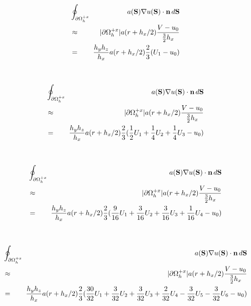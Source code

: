 \documentclass[10pt]{article}
\begin{document}
\begin{minipage}{1.75in}
\end{minipage} \ \ \ \ 
\begin{minipage}{4.00in}
\begin{eqnarray*}
& \oint_{\partial\Omega_h^{+x}} \!\!\! & a(\textbf{S}) \nabla u(\textbf{S})\cdot \textbf{n} \, d\textbf{S}  \\
& \approx & |\partial\Omega_h^{+x}| a(r+h_x/2) \frac{V - u_0}{\frac{3}{2}h_x} \\
& = & \frac{h_yh_z}{h_x}  a(r+h_x/2) \frac{2}{3} (U_1 - u_0)   \\
\end{eqnarray*}
\end{minipage}

\begin{minipage}{1.75in}
\end{minipage} \ \ \ \ 
\begin{minipage}{4.00in}
\begin{eqnarray*}
& \oint_{\partial\Omega_h^{+x}}  \!\!\! & a(\textbf{S}) \nabla u(\textbf{S})\cdot \textbf{n} \, d\textbf{S}  \\
& \approx & |\partial\Omega_h^{+x}| a(r+h_x/2) \frac{V - u_0}{\frac{3}{2}h_x} \\
& = & \frac{h_yh_z}{h_x}  a(r+h_x/2) \frac{2}{3} (\frac{1}{2}U_1 + \frac{1}{4}U_2 + \frac{1}{4}U_3 - u_0)   \\
\end{eqnarray*}
\end{minipage}


\begin{minipage}{1.75in}
\end{minipage} \ \ \ \ 
\begin{minipage}{4.00in}
\begin{eqnarray*}
& \oint_{\partial\Omega_h^{+x}}  \!\!\! & a(\textbf{S}) \nabla u(\textbf{S})\cdot \textbf{n} \, d\textbf{S} \\
& \approx & |\partial\Omega_h^{+x}| a(r+h_x/2) \frac{V - u_0}{\frac{3}{2}h_x} \\
& = & \frac{h_yh_z}{h_x}  a(r+h_x/2) \frac{2}{3} (\frac{9}{16} U_1 + \frac{3}{16} U_2 + \frac{3}{16} U_3 + \frac{1}{16}U_4 - u_0)   \\
\end{eqnarray*}
\end{minipage}


\begin{minipage}{1.75in}
\end{minipage} \ \ \ \ 
\begin{minipage}{4.00in}
\begin{eqnarray*}
 & \oint_{\partial\Omega_h^{+x}} \!\!\! & a(\textbf{S}) \nabla u(\textbf{S})\cdot \textbf{n} \, d\textbf{S}  \\
 & \approx & |\partial\Omega_h^{+x}| a(r+h_x/2) \frac{V - u_0}{\frac{3}{2}h_x} \\
& = & \frac{h_yh_z}{h_x}  a(r+h_x/2) \frac{2}{3} (\frac{30}{32} U_1 + \frac{3}{32} U_2 + \frac{3}{32} U_3 + \frac{2}{32}U_4 - \frac{3}{32}U_5 - \frac{3}{32}U_6 - u_0)   \\
\end{eqnarray*}
\end{minipage}
\end{document}
